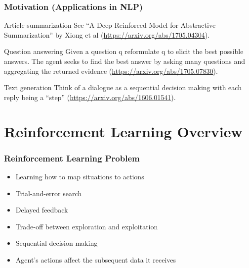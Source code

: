\documentclass{beamer}
\begin{document}

\begin{frame}
\frametitle{Motivation (Applications in NLP)}
\begin{block}{Article summarization}
	See ``A Deep Reinforced Model for Abstractive Summarization''
	by Xiong et al (\url{https://arxiv.org/abs/1705.04304}). 
\end{block}

\begin{block}{Question answering}
	Given a question q reformulate q to elicit the best possible answers. The agent seeks to
	find the best answer by asking many questions and aggregating the returned evidence (\url{https://arxiv.org/abs/1705.07830}).
\end{block}

\begin{block}{Text generation}
	Think of a dialogue as a sequential decision 
	making with each reply being a ``step''  (\url{https://arxiv.org/abs/1606.01541}).
\end{block}
\end{frame}


\section{Reinforcement Learning Overview}



\begin{frame}
\frametitle{Reinforcement Learning Problem}
\begin{itemize}
	\item Learning how to map situations to actions 
	\item Trial-and-error search
	\item Delayed feedback
	\item Trade-off between exploration and exploitation
	\item Sequential decision making
	\item Agent's actions affect the subsequent data it receives
\end{itemize}
\end{frame}
\end{document}
